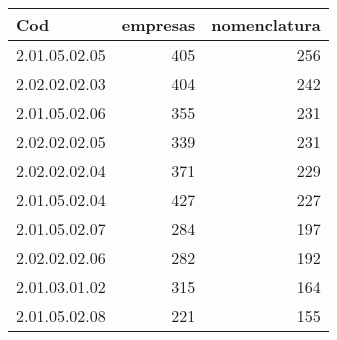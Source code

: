 \begin{table}[ht]
\centering
\begin{tabular}{lrr}
  \hline
Cod & empresas & nomenclatura \\ 
  \hline
2.01.05.02.05 & 405 & 256 \\ 
  2.02.02.02.03 & 404 & 242 \\ 
  2.01.05.02.06 & 355 & 231 \\ 
  2.02.02.02.05 & 339 & 231 \\ 
  2.02.02.02.04 & 371 & 229 \\ 
  2.01.05.02.04 & 427 & 227 \\ 
  2.01.05.02.07 & 284 & 197 \\ 
  2.02.02.02.06 & 282 & 192 \\ 
  2.01.03.01.02 & 315 & 164 \\ 
  2.01.05.02.08 & 221 & 155 \\ 
   \hline
\end{tabular}
\end{table}
